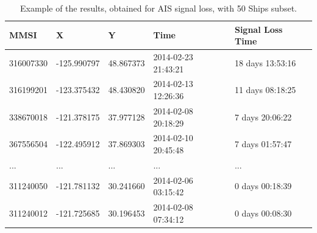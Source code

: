 \begin{table}[H]
\centering
\caption{Example of the results, obtained for AIS signal loss, with 50 Ships subset.}
\label{Table: AIS signal loss}
\begin{tabular}{@{}lllll@{}}
\toprule
MMSI & X & Y & Time & Signal Loss Time \\ \midrule
316007330 & -125.990797 & 48.867373 & 2014-02-23 21:43:21 & 18 days 13:53:16 \\
316199201 & -123.375432 & 48.430820 & 2014-02-13 12:26:36 & 11 days 08:18:25 \\
338670018 & -121.378175 & 37.977128 & 2014-02-08 20:18:29 & 7 days 20:06:22 \\
367556504 & -122.495912 & 37.869303 & 2014-02-10 20:45:48 & 7 days 01:57:47 \\
... & ... & ... & ... & ... \\
311240050 & -121.781132 & 30.241660 & 2014-02-06 03:15:42 & 0 days 00:18:39 \\
311240012 & -121.725685 & 30.196453 & 2014-02-08 07:34:12 & 0 days 00:08:30 \\ 
\bottomrule
\end{tabular}
\end{table}
